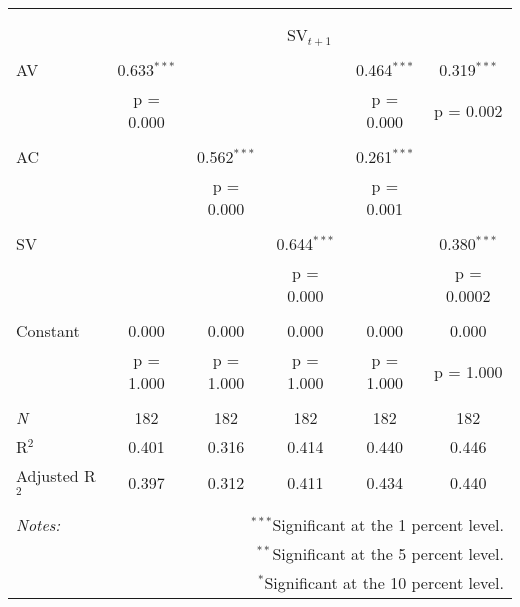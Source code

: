 
\begin{tabular}{@{\extracolsep{5pt}}lccccc} 
\\[-1.8ex]\hline 
\hline \\[-1.8ex] 
\\[-1.8ex] & \multicolumn{5}{c}{SV$_{t+1}$} \\ 
\hline \\[-1.8ex] 
 AV & 0.633$^{***}$ &  &  & 0.464$^{***}$ & 0.319$^{***}$ \\ 
  & p = 0.000 &  &  & p = 0.000 & p = 0.002 \\ 
  & & & & & \\ 
 AC &  & 0.562$^{***}$ &  & 0.261$^{***}$ &  \\ 
  &  & p = 0.000 &  & p = 0.001 &  \\ 
  & & & & & \\ 
 SV &  &  & 0.644$^{***}$ &  & 0.380$^{***}$ \\ 
  &  &  & p = 0.000 &  & p = 0.0002 \\ 
  & & & & & \\ 
 Constant & 0.000 & 0.000 & 0.000 & 0.000 & 0.000 \\ 
  & p = 1.000 & p = 1.000 & p = 1.000 & p = 1.000 & p = 1.000 \\ 
  & & & & & \\ 
\textit{N} & 182 & 182 & 182 & 182 & 182 \\ 
R$^{2}$ & 0.401 & 0.316 & 0.414 & 0.440 & 0.446 \\ 
Adjusted R$^{2}$ & 0.397 & 0.312 & 0.411 & 0.434 & 0.440 \\ 
\hline 
\hline \\[-1.8ex] 
\textit{Notes:} & \multicolumn{5}{r}{$^{***}$Significant at the 1 percent level.} \\ 
 & \multicolumn{5}{r}{$^{**}$Significant at the 5 percent level.} \\ 
 & \multicolumn{5}{r}{$^{*}$Significant at the 10 percent level.} \\ 
\end{tabular} 
